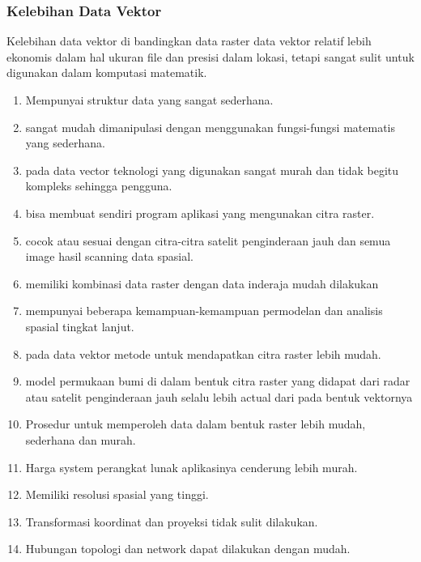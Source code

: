 \begin{enumerate}
\subsubsection{Kelebihan Data Vektor}
Kelebihan data vektor di bandingkan data raster
data vektor relatif lebih ekonomis dalam hal ukuran file dan presisi dalam lokasi, tetapi sangat sulit untuk digunakan dalam komputasi matematik. 
\begin{enumerate}
\item Mempunyai struktur data yang sangat sederhana.
\item sangat mudah dimanipulasi dengan menggunakan fungsi-fungsi matematis yang sederhana.
\item pada data vector teknologi yang digunakan sangat  murah dan tidak begitu kompleks sehingga pengguna.
\item bisa membuat sendiri program aplikasi yang mengunakan citra raster.
\item cocok atau sesuai dengan citra-citra satelit penginderaan jauh dan semua image hasil scanning data spasial.
\item  memiliki kombinasi data raster dengan data inderaja mudah dilakukan
\item mempunyai beberapa kemampuan-kemampuan permodelan dan analisis spasial tingkat lanjut.
\item pada data vektor metode untuk mendapatkan citra raster lebih mudah.
\item model permukaan bumi di dalam bentuk citra raster yang didapat dari radar atau satelit penginderaan jauh selalu lebih actual dari pada bentuk vektornya
\item Prosedur untuk memperoleh data dalam bentuk raster lebih mudah, sederhana dan murah.
\item Harga system perangkat lunak aplikasinya cenderung lebih murah.
\item Memiliki resolusi spasial yang tinggi.
\item Transformasi koordinat dan proyeksi tidak sulit dilakukan.
\item Hubungan topologi dan network dapat dilakukan dengan mudah.
\end{enumerate}


\end{enumerate}
